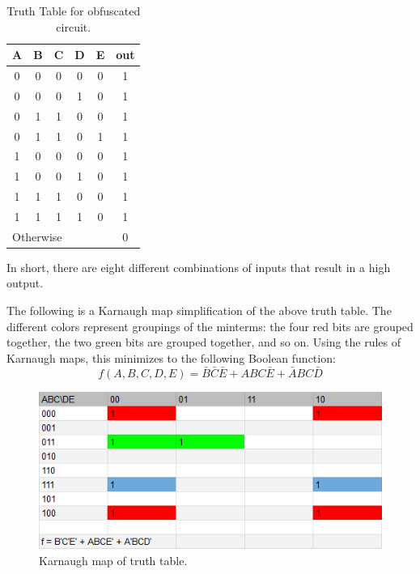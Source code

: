 \documentclass{article}
\begin{document}
\begin{table}[H]
    \centering
    \begin{tabular}{c | c | c | c | c || c}
    
        A & B & C & D & E & out \\ \hline \hline
        0 & 0 & 0 & 0 & 0 & 1 \\ \hline
        0 & 0 & 0 & 1 & 0 & 1 \\ \hline
        0 & 1 & 1 & 0 & 0 & 1 \\ \hline
        0 & 1 & 1 & 0 & 1 & 1 \\ \hline
        1 & 0 & 0 & 0 & 0 & 1 \\ \hline
        1 & 0 & 0 & 1 & 0 & 1 \\ \hline
        1 & 1 & 1 & 0 & 0 & 1 \\ \hline
        1 & 1 & 1 & 1 & 0 & 1 \\ \hline
        \multicolumn{5}{l}{Otherwise} & 0

    \end{tabular}
    \caption{Truth Table for obfuscated circuit.}
    \label{truthtable}
\end{table}

In short, there are eight different combinations of inputs
that result in a high output.

The following is a Karnaugh map simplification of the above
truth table. The different colors represent groupings of the
minterms: the four red bits are grouped together, the two
green bits are grouped together, and so on. Using the rules of
Karnaugh maps, this minimizes to the following Boolean function:
\begin{equation}
    \label{bool}
    f(A, B, C, D, E) =
    \bar{B}\bar{C}\bar{E} + ABC\bar{E} + \bar{A}BC\bar{D}
\end{equation}

\begin{figure}[H]
    \centering
    \includegraphics[width=\textwidth]{Images/kmap}
    \caption{Karnaugh map of truth table.}
    \label{kmap}
\end{figure}
\end{document}
